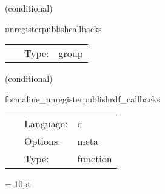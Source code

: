 \vspace{5mm}

\noindent {\bf }   (conditional) 

\hspace{5mm} unregisterpublishcallbacks 

\hspace{5mm}{\it tell cactus that this group exists, but is not scheduled from here } 


\hspace{5mm}

 \begin{tabular*}{160mm}{cll} 
~ & Type:  & group \\ 
\end{tabular*} 


\vspace{5mm}

   (conditional) 

\hspace{5mm} formaline\_unregisterpublishrdf\_callbacks 

\hspace{5mm}{\it unregister rdf callbacks for the publish api } 


\hspace{5mm}

 \begin{tabular*}{160mm}{cll} 
~ & Language:  & c \\ 
~ & Options:  & meta \\ 
~ & Type:  & function \\ 
\end{tabular*} 



\vspace{5mm}\parskip = 10pt 
